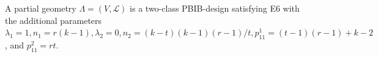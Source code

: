 A partial geometry $\Lambda = (V, \mathcal{L})$ is a two-class PBIB-design satisfying E6 with the additional parameters $\lambda_1 = 1, n_1 = r(k - 1), \lambda_2 = 0, n_2 = (k - t)(k - 1)(r - 1)/t, p_{11}^1 = (t - 1)(r - 1) + k - 2$, and $p_{11}^2 = rt$.
